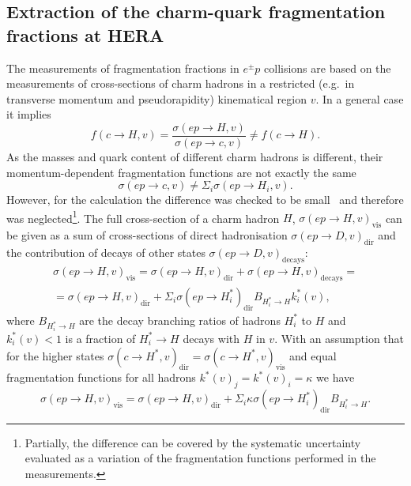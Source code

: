 \begin{appendices}
\section{Extraction of the charm-quark fragmentation fractions at HERA}
\label{sec:appendixB}
The measurements of fragmentation fractions in $e^{\pm}p$ collisions are
 based on  the measurements of cross-sections of charm hadrons in a 
restricted (e.g.\ in transverse momentum and pseudorapidity) kinematical 
 region $v$. In a general case it implies
$$f(c \rightarrow   H,v)= 
\frac{\sigma(ep\rightarrow H, v)}{\sigma(ep\rightarrow c, v)}\neq f(c 
\rightarrow   H).$$
As the masses and quark content of different charm hadrons is different, 
their momentum-dependent  fragmentation functions are not exactly the 
same
$$\sigma(ep\rightarrow c, v) \neq \Sigma_{i}\sigma(ep\rightarrow H_{i}, 
v).$$
However, for the calculation the difference was checked to be 
small~\cite{Chekanov:2005mm} and therefore was neglected\footnote{
Partially, the difference can be covered by the systematic uncertainty
 evaluated as a variation of the fragmentation functions performed in 
 the measurements.}.
The full   cross-section of a  charm hadron $H$, $\sigma(ep\rightarrow 
H, v)_{\text{vis}}$ can be given as a sum of cross-sections of direct 
hadronisation $\sigma(ep\rightarrow  D, v)_{\text{dir}}$ and the 
contribution of decays of other states  
$\sigma(ep\rightarrow  D, v)_{\text{decays}}$:
\begin{multline*}
\sigma(ep\rightarrow H, v)_{\text{vis}}= 
\sigma(ep\rightarrow  H, v)_{\text{dir}}+
\sigma(ep\rightarrow  H, v)_{\text{decays}}=\\
= \sigma(ep\rightarrow  H, v)_{\text{dir}}+
\Sigma_{i} \sigma(ep\rightarrow  H^{*}_i)_{\text{dir}}    
B_{H^{*}_{i} \rightarrow H}k^{*}_i(v),
\end{multline*}
where $B_{H^{*}_{i} \rightarrow H}$ are the decay branching ratios of 
hadrons $H^{*}_{i}$ to $H$ and $k^{*}_i(v)<1$ is a fraction of $H^{*}_i 
\rightarrow H$ decays with $H$  in $v$. With an assumption that for the 
higher states $\sigma(c\rightarrow H^*, v)_{\text{dir}}=
\sigma(c\rightarrow H^*, v)_{\text{vis}}$ and  equal fragmentation 
functions for all hadrons $k^{*}(v)_j=k^{*}(v)_i=\kappa$ we have
$$
\sigma(ep\rightarrow H, v)_{\text{vis}} = 
\sigma(ep\rightarrow  H, v)_{\text{dir}}+   
\Sigma_{i}      \kappa       \sigma(ep\rightarrow  H^{*}_i)_{\text{dir}}
  B_{H^{*}_{i} \rightarrow H}.
$$


\end{appendices}
